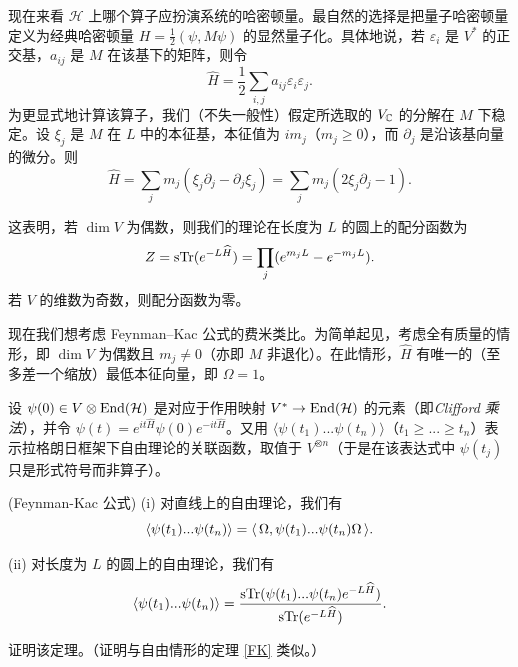 现在来看 ${\mathcal H}$ 上哪个算子应扮演系统的哈密顿量。最自然的选择是把量子哈密顿量定义为经典哈密顿量 $H=\frac{1}{2}(\psi,M\psi)$ 的显然量子化。具体地说，若 $\varepsilon_i$ 是 $V^*$ 的正交基，$a_{ij}$ 是 $M$ 在该基下的矩阵，则令
$$
\widehat{H}=\frac{1}{2}\sum_{i,j} a_{ij}\varepsilon_i\varepsilon_j.
$$
为更显式地计算该算子，我们（不失一般性）假定所选取的 $V_{\Bbb C}$ 的分解在 $M$ 下稳定。设 $\xi_j$ 是 $M$ 在 $L$ 中的本征基，本征值为 $im_j$（$m_j\ge 0$），而 $\partial_j$ 是沿该基向量的微分。则
$$
\widehat H=\sum_j m_j(\xi_j\partial_j-\partial_j\xi_j)=
\sum_j m_j(2\xi_j\partial_j-1).
$$

这表明，若 $\dim V$ 为偶数，则我们的理论在长度为 $L$ 的圆上的配分函数为
$$
Z={\rm sTr}(e^{-L\widehat H})=\prod_j (e^{m_jL}-e^{-m_jL}).
$$
若 $V$ 的维数为奇数，则配分函数为零。


现在我们想考虑 Feynman–Kac 公式的费米类比。为简单起见，考虑全有质量的情形，即 $\dim V$ 为偶数且 $m_j\ne 0$（亦即 $M$ 非退化）。在此情形，$\widehat H$ 有唯一的（至多差一个缩放）最低本征向量，即 $\Omega=1$。

设 $\psi(0)\in V\otimes {\rm End}({\mathcal H})$ 是对应于作用映射 $V^*\to {\rm End}({\mathcal H})$ 的元素（即\emph{Clifford 乘法}），并令 $\psi(t)=e^{it\widehat H}\psi(0)e^{-it\widehat H}$。又用 $\langle\psi(t_1)...\psi(t_n)\rangle$（$t_1\ge...\ge t_n$）表示拉格朗日框架下自由理论的关联函数，取值于 $V^{\otimes n}$（于是在该表达式中 $\psi(t_j)$ 只是形式符号而非算子）。

\begin{theorem} (Feynman-Kac 公式)
(i) 对直线上的自由理论，我们有
$$
\langle\psi(t_1)...\psi(t_n)\rangle=
\la\Omega,\psi(t_1)...\psi(t_n)\Omega\ra.
$$

(ii) 对长度为 $L$ 的圆上的自由理论，我们有
$$
\langle\psi(t_1)...\psi(t_n)\rangle=
\frac{{\rm sTr}(\psi(t_1)...\psi(t_n)e^{-L\widehat H})}{{\rm sTr}(e^{-L\widehat H})}.
$$
\end{theorem}

\begin{exercise} 证明该定理。（证明与自由情形的定理 \ref{FK} 类似。）
\end{exercise}


